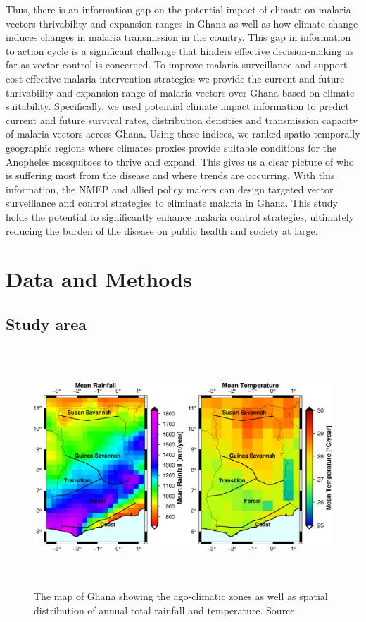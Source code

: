 \documentclass[utf8]{FrontiersinHarvard} %
\begin{document}
Thus, there is an information gap on the potential impact of climate on malaria vectors thrivability and expansion ranges in Ghana as well as how climate change induces changes in malaria transmission in the country. This gap in information to action cycle is a significant challenge that hinders effective decision-making as far as vector control is concerned.
\noindent To improve malaria surveillance and support cost-effective malaria intervention strategies we provide the current and future thrivability and expansion range of malaria vectors over Ghana based on climate suitability. Specifically, we used potential climate impact information to predict current and future survival rates, distribution densities and  transmission capacity of malaria vectors across Ghana. Using these indices, we ranked spatio-temporally geographic regions where climates proxies provide suitable conditions for the Anopheles mosquitoes to thrive and expand. This gives us a clear picture of who is suffering most from the disease and where trends are occurring. With this information, the NMEP and allied policy makers can design targeted vector surveillance and control strategies to eliminate malaria in Ghana. This study holds the potential to significantly enhance malaria control strategies, ultimately reducing the burden of the disease on public health and society at large. \\

\section{Data and Methods}
\subsection{Study area}

\begin{figure}[ht]
\begin{center}
\includegraphics[width=15cm,height=9cm]{RRTmclimmap.eps}
\caption{The map of Ghana showing the ago-climatic zones as well as spatial distribution of annual total rainfall and temperature. Source: \citep{yamba2023revisiting}}
\label{fig:3.0}
\end{center}
\end{figure}
\end{document}
